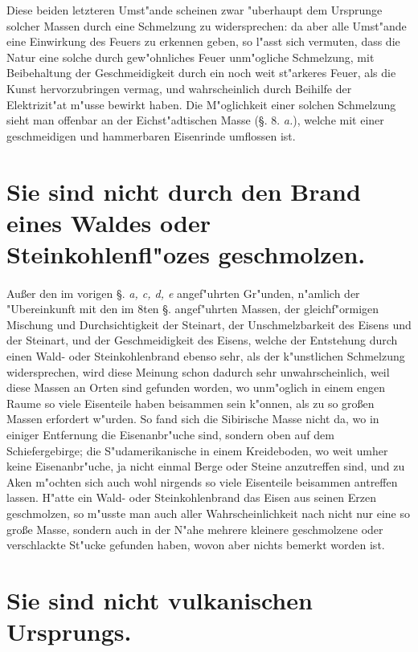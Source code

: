 \documentclass[a4paper, 11pt, oneside, polutonikogreek, german]{article}
\begin{document}
Diese beiden letzteren Umst"ande scheinen zwar "uberhaupt dem Ursprunge solcher Massen durch eine Schmelzung zu widersprechen: da aber alle Umst"ande eine Einwirkung des Feuers zu erkennen geben, so l"asst sich vermuten, dass die Natur eine solche durch gew"ohnliches Feuer unm"ogliche Schmelzung, mit Beibehaltung der Geschmeidigkeit durch ein noch weit st"arkeres Feuer, als die Kunst hervorzubringen vermag, und wahrscheinlich durch Beihilfe der Elektrizit"at m"usse bewirkt haben. Die M"oglichkeit einer solchen Schmelzung sieht man offenbar an der Eichst"adtischen Masse (§. 8. \emph{a.}), welche mit einer geschmeidigen und hammerbaren Eisenrinde umflossen ist.
\clearpage
\section{Sie sind nicht durch den Brand eines Waldes oder Steinkohlenfl"ozes geschmolzen.}
\paragraph{}
Außer den im vorigen §. \emph{a, c, d, e} angef"uhrten Gr"unden, n"amlich der "Ubereinkunft mit den im 8ten §. angef"uhrten Massen, der gleichf"ormigen Mischung und Durchsichtigkeit der Steinart, der Unschmelzbarkeit des Eisens und der Steinart, und der Geschmeidigkeit des Eisens, welche der Entstehung durch einen Wald- oder Steinkohlenbrand ebenso sehr, als der k"unstlichen Schmelzung widersprechen, wird diese Meinung schon dadurch sehr unwahrscheinlich, weil diese Massen an Orten sind gefunden worden, wo unm"oglich in einem engen Raume so viele Eisenteile haben beisammen sein k"onnen, als zu so großen Massen erfordert w"urden. So fand sich die Sibirische Masse nicht da, wo in einiger Entfernung die Eisenanbr"uche sind, sondern oben auf dem Schiefergebirge; die S"udamerikanische in einem Kreideboden, wo weit umher keine Eisenanbr"uche, ja nicht einmal Berge oder Steine anzutreffen sind, und zu Aken m"ochten sich auch wohl nirgends so viele Eisenteile beisammen antreffen lassen. H"atte ein Wald- oder Steinkohlenbrand das Eisen aus seinen Erzen geschmolzen, so m"usste man auch aller Wahrscheinlichkeit nach nicht nur eine so große Masse, sondern auch in der N"ahe mehrere kleinere geschmolzene oder verschlackte St"ucke gefunden haben, wovon aber nichts bemerkt worden ist.
\clearpage
\section{Sie sind nicht vulkanischen Ursprungs.}
\end{document}
